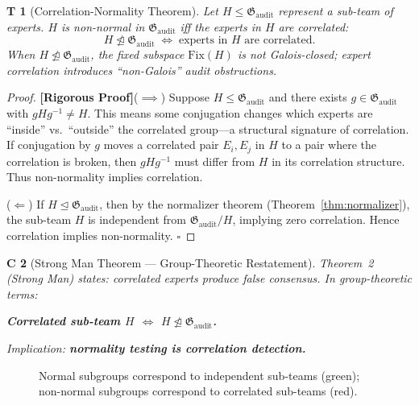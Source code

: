 \documentclass[12pt,a4paper]{article}
\newtheorem{theorem}Theorem[section]
\newtheorem{corollary}[theorem]Corollary
\theoremstyle{remark}
\newcommand{\Fix}{\mathrm{Fix}}
\newcommand{\Normal}{\trianglelefteq}
\newcommand{\NotNormal}{\ntrianglelefteq}
\newcommand{\AuditGrp}{\mathfrak{G}_{\mathrm{audit}}}
\newcommand{\rigorous}{\textnormal{\textbf{[Rigorous Proof]}}}
\begin{document}
\begin{theorem}[Correlation-Normality Theorem]\label{thm:correlation_nonnormal}
Let \(H \leq \AuditGrp\) represent a sub-team of experts. \(H\) is non-normal in \(\AuditGrp\) iff the experts in \(H\) are correlated:
\begin{equation}
    H \NotNormal \AuditGrp \;\Longleftrightarrow\; \text{experts in }H\text{ are correlated}.
\end{equation}
When \(H \NotNormal \AuditGrp\), the fixed subspace \(\Fix(H)\) is not Galois-closed; expert correlation introduces ``non-Galois'' audit obstructions.
\end{theorem}
\begin{proof}
\rigorous (\(\implies\)) Suppose \(H \leq \AuditGrp\) and there exists \(g \in \AuditGrp\) with \(g H g^{-1} \neq H\). This means some conjugation changes which experts are ``inside'' vs.\ ``outside'' the correlated group---a structural signature of correlation. If conjugation by \(g\) moves a correlated pair \(E_i, E_j\) in \(H\) to a pair where the correlation is broken, then \(g H g^{-1}\) must differ from \(H\) in its correlation structure. Thus non-normality implies correlation.

(\(\Longleftarrow\)) If \(H \Normal \AuditGrp\), then by the normalizer theorem (Theorem~\ref{thm:normalizer}), the sub-team \(H\) is independent from \(\AuditGrp/H\), implying zero correlation. Hence correlation implies non-normality. \(\square\)
\end{proof}

\begin{corollary}[Strong Man Theorem --- Group-Theoretic Restatement]
Theorem~2 (Strong Man) states: correlated experts produce false consensus. In group-theoretic terms:
\begin{center}
    \textbf{Correlated sub-team \(H\) \(\iff\) \(H \NotNormal \AuditGrp\).}
\end{center}
Implication: \textbf{normality testing is correlation detection.}
\end{corollary}

\begin{figure}[htbp]
\centering
{}
\caption{Normal subgroups correspond to independent sub-teams (green); non-normal subgroups correspond to correlated sub-teams (red).}\label{fig:subgroup_structure}
\end{figure}
\end{document}
